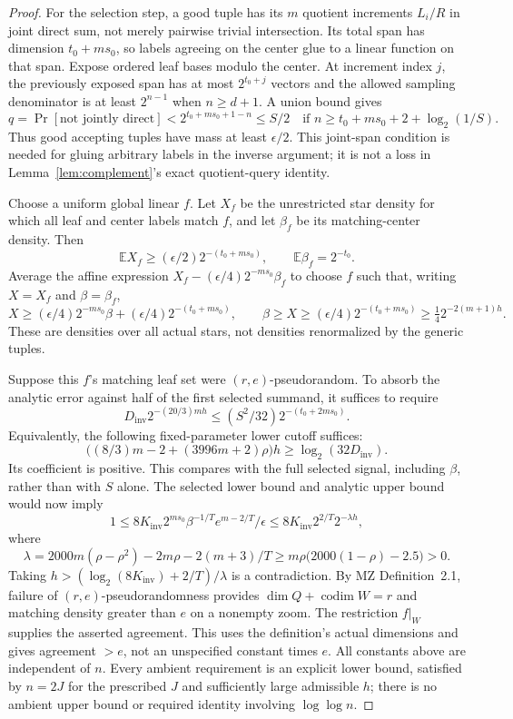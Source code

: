 \begin{proof}
For the selection step, a good tuple has its $m$ quotient increments
$L_i/R$ in joint direct sum, not merely pairwise trivial intersection.
Its total span has dimension $t_0+ms_0$, so labels agreeing on the
center glue to a linear function on that span. Expose ordered leaf
bases modulo the center. At increment index $j$, the previously
exposed span has at most $2^{t_0+j}$ vectors and the allowed sampling
denominator is at least $2^{n-1}$ when $n\ge d+1$. A union bound gives
\[
 q=\Pr[\text{not jointly direct}]<2^{t_0+ms_0+1-n}\le S/2
 \quad\text{if } n\ge t_0+ms_0+2+\log_2(1/S).
\]
Thus good accepting tuples have mass at least $\epsilon/2$.
This joint-span condition is needed for gluing arbitrary labels in the
inverse argument; it is not a loss in Lemma~\ref{lem:complement}'s
exact quotient-query identity.

Choose a uniform global linear $f$. Let $X_f$ be the unrestricted
star density for which all leaf and center labels match $f$, and let
$\beta_f$ be its matching-center density. Then
\[
 \mathbb E X_f\ge(\epsilon/2)2^{-(t_0+ms_0)},\qquad
 \mathbb E\beta_f=2^{-t_0}.
\]
Average the affine expression
$X_f-(\epsilon/4)2^{-ms_0}\beta_f$ to choose $f$ such that, writing
$X=X_f$ and $\beta=\beta_f$,
\[
 X\ge(\epsilon/4)2^{-ms_0}\beta
          +(\epsilon/4)2^{-(t_0+ms_0)},\qquad
 \beta\ge X\ge(\epsilon/4)2^{-(t_0+ms_0)}
                \ge\tfrac14 2^{-2(m+1)h}.
\]
These are densities over all actual stars, not densities renormalized
by the generic tuples.

Suppose this $f$'s matching leaf set were $(r,e)$-pseudorandom.
To absorb the analytic error against half of the first selected
summand, it suffices to require
\[
 D_{\mathrm{inv}}2^{-(20/3)mh}
 \le (S^2/32)2^{-(t_0+2ms_0)}.
\]
Equivalently, the following fixed-parameter lower cutoff suffices:
\[
 \bigl((8/3)m-2+(3996m+2)\rho\bigr)h
       \ge\log_2(32D_{\mathrm{inv}}).
\]
Its coefficient is positive. This compares with the full selected
signal, including $\beta$, rather than with $S$ alone.
The selected lower bound and analytic upper bound would now imply
\[
 1\le8K_{\mathrm{inv}}2^{ms_0}\beta^{-1/T}
                  e^{m-2/T}/\epsilon
 \le8K_{\mathrm{inv}}2^{2/T}2^{-\lambda h},
\]
where
\[
 \lambda=2000m(\rho-\rho^2)-2m\rho-2(m+3)/T
 \ge m\rho\bigl(2000(1-\rho)-2.5\bigr)>0.
\]
Taking $h>(\log_2(8K_{\mathrm{inv}})+2/T)/\lambda$ is a contradiction.
By MZ Definition~2.1, failure of $(r,e)$-pseudorandomness provides
$\dim Q+\operatorname{codim}W=r$ and matching density greater than
$e$ on a nonempty zoom. The restriction $f|_W$ supplies the asserted
agreement. This uses the definition's actual dimensions and gives
agreement $>e$, not an unspecified constant times $e$.
All constants above are independent of $n$. Every ambient requirement
is an explicit lower bound, satisfied by $n=2J$ for the prescribed
$J$ and sufficiently large admissible $h$; there is no ambient upper
bound or required identity involving $\log\log n$.
\end{proof}

